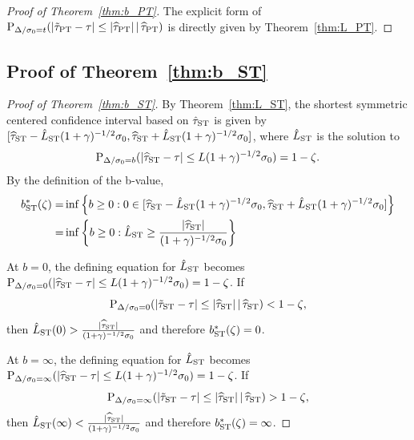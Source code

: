 \documentclass[11pt]{article}
\def\given{\,|\,}
\def\P{{\mathrm P}}
\newcommand{\htau}{\widehat\tau}
\numberwithin{equation}{section}
\theoremstyle{definition}
\begin{document}
\begin{proof}[Proof of Theorem~\ref{thm:b_PT}]
The explicit form of $\P_{\Delta/\sigma_0 = t}(\lvert \tilde\tau_{\rm PT} - \tau \rvert \le \lvert \htau_{\rm PT} \rvert \given \htau_{\rm PT})$ is directly given by Theorem~\ref{thm:L_PT}.

\end{proof}

\subsection{Proof of Theorem~\ref{thm:b_ST}}

\begin{proof}[Proof of Theorem~\ref{thm:b_ST}]

By Theorem~\ref{thm:L_ST}, the shortest symmetric centered confidence interval based on $\hat\tau_{\rm ST}$ is given by $[\htau_{\rm ST} - \hat{L}_{\rm ST} (1+\gamma)^{-1/2} \sigma_0, \htau_{\rm ST} + \hat{L}_{\rm ST} (1+\gamma)^{-1/2} \sigma_0]$, where $\hat{L}_{\rm ST}$ is the solution to
\begin{align*}
  \P_{\Delta/\sigma_0 = b}(\lvert \htau_{\rm ST}- \tau \rvert \le L (1+\gamma)^{-1/2} \sigma_0) = 1-\zeta.
\end{align*}
By the definition of the b-value,
\begin{align*}
  b^*_{\rm ST}(\zeta) =& \inf\left\{b \ge 0: 0 \in [\htau_{\rm ST} - \hat{L}_{\rm ST} (1+\gamma)^{-1/2} \sigma_0, \htau_{\rm ST} + \hat{L}_{\rm ST} (1+\gamma)^{-1/2} \sigma_0]\right\}\\
  =& \inf\left\{b \ge 0: \hat{L}_{\rm ST} \ge \frac{\lvert \htau_{\rm ST} \rvert}{(1+\gamma)^{-1/2} \sigma_0}\right\}
\end{align*}

At $b=0$, the defining equation for $\hat{L}_{\rm ST}$ becomes $\P_{\Delta/\sigma_0 = 0}(\lvert \htau_{\rm ST} - \tau \rvert \le L (1+\gamma)^{-1/2} \sigma_0) = 1-\zeta$. If
\[
  \P_{\Delta/\sigma_0 = 0}(\lvert \tilde\tau_{\rm ST} - \tau \rvert \le \lvert \htau_{\rm ST} \rvert \given \htau_{\rm ST}) < 1-\zeta,
\]
then $\hat{L}_{\rm ST}(0) > \frac{\lvert \htau_{\rm ST} \rvert}{(1+\gamma)^{-1/2} \sigma_0}$ and therefore $b^*_{\rm ST}(\zeta)=0$.

At $b=\infty$, the defining equation for $\hat{L}_{\rm ST}$ becomes $\P_{\Delta/\sigma_0 = \infty}(\lvert \htau_{\rm ST}- \tau \rvert \le L (1+\gamma)^{-1/2} \sigma_0) = 1-\zeta$. If
\[
  \P_{\Delta/\sigma_0 = \infty}(\lvert \tilde\tau_{\rm ST} - \tau \rvert \le \lvert \htau_{\rm ST} \rvert \given \htau_{\rm ST}) > 1-\zeta,
\]
then $\hat{L}_{\rm ST}(\infty) < \frac{\lvert \htau_{\rm ST} \rvert}{(1+\gamma)^{-1/2} \sigma_0}$ and therefore $b^*_{\rm ST}(\zeta)=\infty$.


\end{proof}
\end{document}
